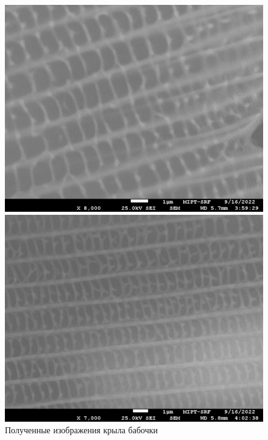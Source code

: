 \documentclass[a4paper,12pt]{article} %
\begin{document}
\begin{figure}[h]
\begin{minipage}{0.49\textwidth}
\vspace{0.5em}
\includegraphics[width=\textwidth]{Butterfly003.jpg}
\vspace{-2em}
\end{minipage}
\begin{minipage}{0.49\textwidth}
\vspace{0.5em}
\includegraphics[width=\textwidth]{Butterfly004.jpg}
\vspace{-2em}
\end{minipage}
\caption{Полученные изображения крыла бабочки}
\label{fig:butter}
\end{figure}
\end{document}
